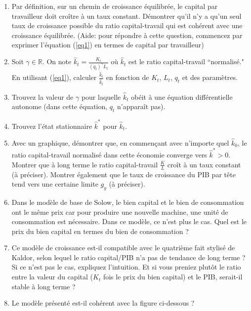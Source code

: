 \documentclass{article}
\begin{document}
\begin{enumerate}
\item Par définition, sur un chemin de croissance équilibrée, le capital par travailleur doit croître à un taux constant.  Démontrer qu'il n'y a qu'un seul taux de croissance possible du ratio capital-travail qui est cohérent avec une croissance équilibrée. (Aide: pour répondre à cette question, commencez par exprimer l'équation (\ref{eq1}) en termes de capital par travailleur)

\item Soit \( \gamma \in \mathbb{R} \). On note  \( \hat{k}_t = \frac{K_t}{(q_t)^{\gamma} L_t} \) où $\hat{k}_t$ est le ratio capital-travail “normalisé." En utilisant (\ref{eq1}), calculer \( \frac{\dot{\hat{k}}_t}{\hat{k}_t} \) en fonction de \( K_t \), \( L_t \), \( q_t \) et des paramètres.

 \item Trouvez la valeur de \( \gamma \) pour laquelle \( \hat{k}_t \) obéit à une équation différentielle autonome (dans cette équation, 
$q_t$ n'apparaît pas).   \item Trouvez l'état stationnaire $\hat{k}^{\ast}$ pour \( \hat{k}_t \).  \item Avec un graphique, démontrer que, en commençant avec n'importe quel \( \hat{k}_0 \), le ratio capital-travail normalisé dans cette économie converge vers \( \hat{k}^{\ast}>0 \). Montrer que à long terme le ratio capital-travail \( \frac{K}{L} \) croît à un taux constant (à préciser). Montrer également que le taux de croissance du PIB par tête tend vers une certaine limite \( g_y \) (à préciser).


 \item Dans le modèle de base de Solow, le bien capital et le bien de consommation ont le même prix car pour produire une nouvelle machine, une unité de consommation est nécessaire. Dans ce modèle, ce n'est plus le cas. Quel est le prix du bien capital en termes du bien de consommation ? 
\item Ce modèle de croissance est-il compatible avec le quatrième fait stylisé de Kaldor, selon lequel le ratio capital/PIB n’a pas de tendance de long terme ? Si ce n'est pas le cas, expliquez l'intuition. Et si vous preniez plutôt le ratio entre la valeur du capital ($K_t$ fois le prix du bien capital) et le PIB, serait-il stable à long terme ?
\item Le modèle présenté est-il cohérent avec la figure ci-dessous ?
\bigskip 


\end{enumerate}
\end{document}
